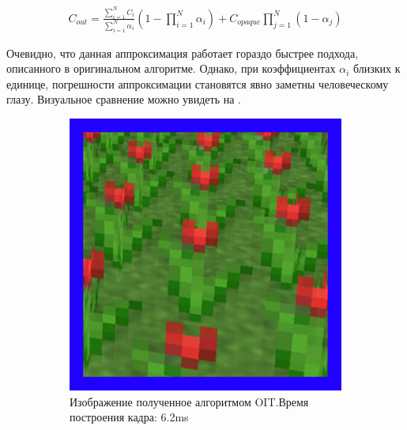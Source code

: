 			\begin{equation}
				\label{eq:wboit-formula}
				\begin{multlined}	 
					C_{out} = \frac{\sum_{i=1}^{N}C_i}{\sum_{i=1}^{N}\alpha_i}(1 - \prod_{i=1}^{N}\alpha_i) + 
					C_{opaque}\prod _{j=1}^{N}(1 - \alpha_j)   
				\end{multlined}
			\end{equation}
			
			Очевидно, что данная аппроксимация работает гораздо быстрее подхода, описанного в оригинальном алгоритме. Однако, при коэффициентах $\alpha_i$ близких к единице, погрешности аппроксимации становятся явно заметны человеческому глазу. Визуальное сравнение можно увидеть на .
			
			\begin{figure}[!htbp]
				\centering
				\begin{subfigure}[b]{0.3\textwidth}
					\centering
					\includegraphics[width=\textwidth]{my_folder/images//oit_flower}
					\caption{Изображение полученное алгоритмом OIT.\linebreak Время построения кадра: 6.2ms}
					\label{fig:oit_flower}
				\end{subfigure}
				\begin{subfigure}[b]{0.3\textwidth}
					\centering

\end{subfigure}
\end{figure}
